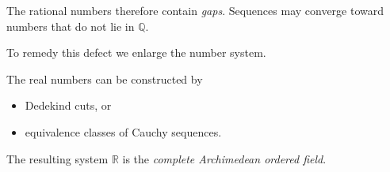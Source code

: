 The rational numbers therefore contain \emph{gaps}.
Sequences may converge toward numbers that do not lie in $\mathbb{Q}$.

To remedy this defect we enlarge the number system.

The real numbers can be constructed by

\begin{itemize}

\item Dedekind cuts, or
\item equivalence classes of Cauchy sequences.

\end{itemize}

The resulting system $\mathbb{R}$ is the
\emph{complete Archimedean ordered field}.